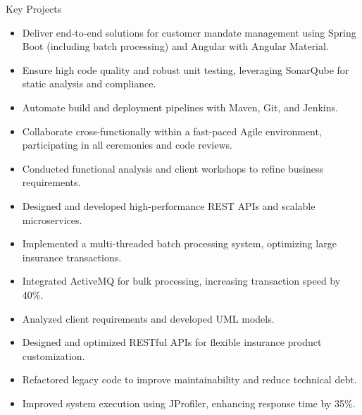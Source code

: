 \documentclass{resume}
\begin{document}

\begin{experienceSection}{Key Projects}

\projectItem[
title={BGL BNP Paribas Mandate Management (Full-Stack Engineer)},
duration={2025 – Present},
keyHighlight=Developing mandate management features for banking systems in a fully Agile tribe and squad.
]
\begin{itemize}
\itemsep -6pt {}
\item Deliver end-to-end solutions for customer mandate management using Spring Boot (including batch processing) and Angular with Angular Material.
\item Ensure high code quality and robust unit testing, leveraging SonarQube for static analysis and compliance.
\item Automate build and deployment pipelines with Maven, Git, and Jenkins.
\item Collaborate cross-functionally within a fast-paced Agile environment, participating in all ceremonies and code reviews.
\end{itemize}

\projectItem[
title={SalesFlow (Lead Developer)},
duration={2023 – 2024},
keyHighlight=Led migration to Camunda BPM-based architecture, reducing manual processes by 30\%.
]
\begin{itemize}
\itemsep -6pt {}
\item Conducted functional analysis and client workshops to refine business requirements.
\item Designed and developed high-performance REST APIs and scalable microservices.
\item Implemented a multi-threaded batch processing system, optimizing large insurance transactions.
\item Integrated ActiveMQ for bulk processing, increasing transaction speed by 40\%.
\end{itemize}

\projectItem[
title={PackManager (Backend Developer)},
duration={2022 – 2023},
keyHighlight=Developed a configuration platform for insurance products, streamlining offer creation.
]
\begin{itemize}
\itemsep -6pt {}
\item Analyzed client requirements and developed UML models.
\item Designed and optimized RESTful APIs for flexible insurance product customization.
\item Refactored legacy code to improve maintainability and reduce technical debt.
\item Improved system execution using JProfiler, enhancing response time by 35\%.
\end{itemize}


\end{experienceSection}
\end{document}
